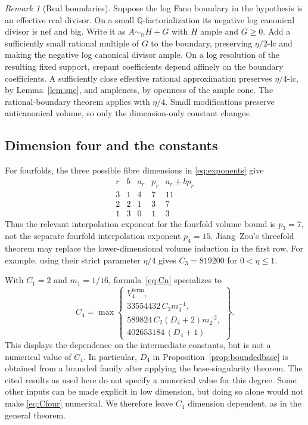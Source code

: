 \documentclass[11pt,reqno]{amsart}
\numberwithin{equation}{section}
\theoremstyle{definition}
\theoremstyle{remark}
\newtheorem{remark}[theorem]{Remark}
\newcommand{\Q}{\mathbb Q}
\newcommand{\R}{\mathbb R}
\begin{document}
\begin{remark}[Real boundaries]\label{rem:real}
Suppose the log Fano boundary in the hypothesis is an effective real divisor. On a small $\Q$-factorialization its negative log canonical divisor is nef and big. Write it as $A\sim_\R H+G$ with $H$ ample and $G\ge0$. Add a sufficiently small rational multiple of $G$ to the boundary, preserving $\eta/2$-lc and making the negative log canonical divisor ample. On a log resolution of the resulting fixed support, crepant coefficients depend affinely on the boundary coefficients. A sufficiently close effective rational approximation preserves $\eta/4$-lc, by Lemma~\ref{lem:snc}, and ampleness, by openness of the ample cone. The rational-boundary theorem applies with $\eta/4$. Small modifications preserve anticanonical volume, so only the dimension-only constant changes.
\end{remark}

\subsection{Dimension four and the constants}
For fourfolds, the three possible fibre dimensions in \eqref{eq:exponents} give
\[
\begin{array}{c|c|c|c|c}
 r&b&a_r&p_r&a_r+bp_r\\\hline
 3&1&4&7&11\\
 2&2&1&3&7\\
 1&3&0&1&3
\end{array}
\]
Thus the relevant interpolation exponent for the fourfold volume bound is $p_3=7$, not the separate fourfold interpolation exponent $p_4=15$. Jiang--Zou's threefold theorem \cite[Theorem~1.1]{JZ24} may replace the lower-dimensional volume induction in the first row. For example, using their strict parameter $\eta/4$ gives $C_3=819200$ for $0<\eta\le1$.

With $C_1=2$ and $m_1=1/16$, formula~\eqref{eq:Cn} specializes to
\begin{equation}\label{eq:Cfour}
 C_4=\max\left\{
 \begin{array}{l}
 V_4^{\mathrm{term}},\\
 33554432\,C_3m_3^{-1},\\
 589824\,C_2(D_4+2)m_2^{-2},\\
 402653184\,(D_4+1)
 \end{array}\right\}.
\end{equation}
This displays the dependence on the intermediate constants, but is not a numerical value of $C_4$. In particular, $D_4$ in Proposition~\ref{prop:boundedbase} is obtained from a bounded family after applying the base-singularity theorem. The cited results as used here do not specify a numerical value for this degree. Some other inputs can be made explicit in low dimension, but doing so alone would not make \eqref{eq:Cfour} numerical. We therefore leave $C_4$ dimension dependent, as in the general theorem.
\end{document}
